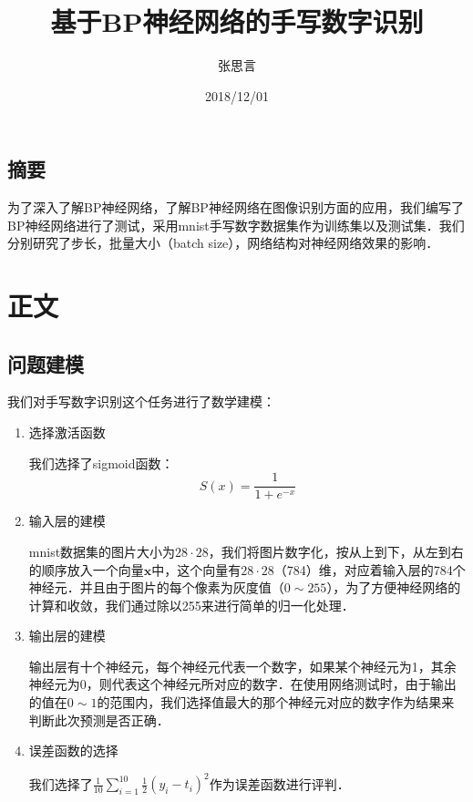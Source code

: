 \documentclass{article}
\begin{document}
\title{基于BP神经网络的手写数字识别}
\author{张思言}
\date{2018/12/01}
\maketitle

  \begin{center}
    \section*{摘要}
  \end{center}
    为了深入了解BP神经网络，了解BP神经网络在图像识别方面的应用，我们编写了BP神经网络进行了测试，采用mnist手写数字数据集作为训练集以及测试集．我们分别研究了步长，批量大小（batch size），网络结构对神经网络效果的影响．

  \newpage

  \section{正文}

  \subsection{问题建模}
    我们对手写数字识别这个任务进行了数学建模：
  \begin{enumerate}

    \item 选择激活函数

      我们选择了sigmoid函数：
      \begin{equation}
        S(x) = \frac{1}{1+e^{-x}}
      \end{equation}

    \item 输入层的建模

      mnist数据集的图片大小为$28\cdot 28$，我们将图片数字化，按从上到下，从左到右的顺序放入一个向量$\bm{x}$中，这个向量有$28\cdot28$（784）维，对应着输入层的784个神经元．并且由于图片的每个像素为灰度值（$0\sim255$），为了方便神经网络的计算和收敛，我们通过除以255来进行简单的归一化处理．

    \item 输出层的建模

      输出层有十个神经元，每个神经元代表一个数字，如果某个神经元为1，其余神经元为0，则代表这个神经元所对应的数字．在使用网络测试时，由于输出的值在$0\sim1$的范围内，我们选择值最大的那个神经元对应的数字作为结果来判断此次预测是否正确．

    \item 误差函数的选择

      我们选择了$\frac{1}{10}\sum_{i=1}^{10}{\frac{1}{2} (y_i - t_i) ^2}$作为误差函数进行评判．
  \end{enumerate}
\end{document}
